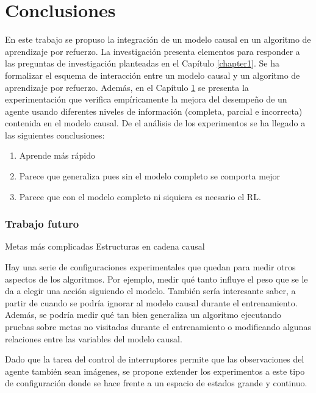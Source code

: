\chapter{Conclusiones}\label{chapter5}

\graphicspath{{Chapter5/Figs/}}

En este trabajo se propuso la integración de un modelo causal en un
algoritmo de aprendizaje por refuerzo.
La investigación presenta
elementos para responder a las preguntas de investigación planteadas en el Capítulo \ref{chapter1}.
Se ha formalizar el esquema 
    de interacción entre
    un modelo causal y un algoritmo de aprendizaje por
    refuerzo.
    Además, en el Capítulo \ref{chapter5} se presenta la experimentación que verifica empíricamente
    la mejora del desempeño de un agente usando diferentes niveles de información (completa, parcial e incorrecta) contenida en el modelo causal. De el análisis de los experimentos 
    se ha llegado a las siguientes conclusiones:
    
\begin{enumerate}
    \item Aprende más rápido 
    \item Parece que generaliza pues sin el modelo completo se
    comporta mejor
    \item Parece que con el modelo completo ni siquiera es 
    neesario el RL.
\end{enumerate}
\subsection{Trabajo futuro}

Metas más complicadas
Estructuras en cadena causal

Hay una serie de configuraciones experimentales que quedan 
para medir otros aspectos de los algoritmos. Por ejemplo,
medir qué tanto influye el peso que se le da a elegir una 
acción siguiendo el modelo. También sería interesante saber,
a partir de cuando se podría ignorar al modelo causal durante el entrenamiento. Además,
se podría medir qué tan bien generaliza un algoritmo
ejecutando pruebas sobre metas no visitadas durante el entrenamiento
o modificando algunas relaciones entre las variables del modelo causal.

Dado que la tarea del control de interruptores  permite
que las observaciones del agente también sean imágenes,
se propone extender los experimentos a este tipo de configuración
donde se hace frente a un espacio de estados grande y continuo.

